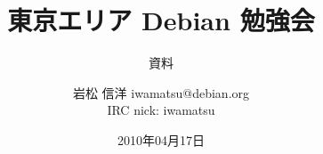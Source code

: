 




\documentclass[cjk,dvipdfmx,12pt]{beamer}
\usepackage{monthlypresentation}


\title{東京エリア Debian 勉強会}
\subtitle{資料}
\author{岩松 信洋 iwamatsu@debian.org\\IRC nick: iwamatsu}
\date{2010年04月17日}



